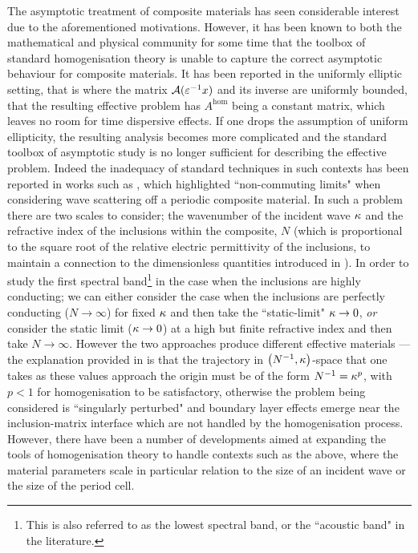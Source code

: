 The asymptotic treatment of composite materials has seen considerable interest due to the aforementioned motivations.
However, it has been known to both the mathematical and physical community for some time that the toolbox of standard homogenisation theory is unable to capture the correct asymptotic behaviour for composite materials.
It has been reported  in the uniformly elliptic setting, that is where the matrix $\mathcal{A}(\varepsilon^{-1}x)$ and its inverse are uniformly bounded, that the resulting effective problem has $A^{\mathrm{hom}}$ being a constant matrix, which leaves no room for time dispersive effects.
If one drops the assumption of uniform ellipticity, the resulting analysis becomes more complicated and the standard toolbox of asymptotic study is no longer sufficient for describing the effective problem.
Indeed the inadequacy of standard techniques in such contexts has been reported in works such as , which highlighted ``non-commuting limits" when considering wave scattering off a periodic composite material.
In such a problem there are two scales to consider; the wavenumber of the incident wave $\kappa$ and the refractive index of the inclusions within the composite, $N$ (which is proportional to the square root of the relative electric permittivity of the inclusions, to maintain a connection to the dimensionless quantities introduced in ).
In order to study the first spectral band\footnote{This is also referred to as the lowest spectral band, or the ``acoustic band" in the literature.} in the case when the inclusions are highly conducting; we can either consider the case when the inclusions are perfectly conducting ($N\rightarrow\infty$) for fixed $\kappa$ and then take the ``static-limit" $\kappa\rightarrow0$, \emph{or} consider the static limit ($\kappa\rightarrow0$) at a high but finite refractive index and then take $N\rightarrow\infty$.
However the two approaches produce different effective materials --- the explanation provided in  is that the trajectory in $\left( N^{-1},\kappa \right)$-space that one takes as these values approach the origin must be of the form $N^{-1}=\kappa^p$, with $p<1$ for homogenisation to be satisfactory, otherwise the problem being considered is ``singularly perturbed" and boundary layer effects emerge near the inclusion-matrix interface which are not handled by the homogenisation process.
However, there have been a number of developments aimed at expanding the tools of homogenisation theory to handle contexts such as the above, where the material parameters scale in particular relation to the size of an incident wave or the size of the period cell.

